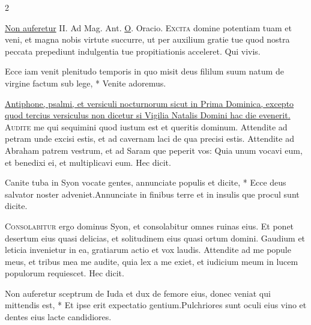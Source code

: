 \begin{multicols*}{2}
{\color{Red} }
\par {} \R \hyperlink{non-auferetur}{Non auferetur} {\color{Red} II. Ad Mag. Ant.} \hyperlink{o-antiphons}{O}. {\color{Red} Oracio.}
\lettrine[lines=2]{\zallmancaps \color{Blue} E}{xcita} domine potentiam tuam et veni, et magna nobis virtute succurre, ut per auxilium gratie tue quod nostra peccata prepediunt indulgentia tue propitiationis acceleret. Qui vivis.
\begin{invitatory}
{Ecce iam venit plenitudo temporis in quo misit deus fililum suum natum de virgine factum sub lege, * Venite adoremus.}
\end{invitatory}
\newline \ul{Antiphone, psalmi, et versiculi nocturnorum sicut in Prima Dominica, excepto quod tercius versiculus non dicetur si Vigilia Natalis Domini hac die evenerit.}
\lettrine[lines=2]{\zallmancaps \color{Red} A}{udite} me qui sequimini quod iustum est et queritis dominum. Attendite ad petram unde excisi estis, et ad cavernam laci de qua precisi estis. Attendite ad Abraham patrem vestrum, et ad Saram que peperit vos: Quia unum vocavi eum, et benedixi ei, et multiplicavi eum. Hec dicit.
\begin{responsory}
{Canite tuba in Syon vocate gentes, annunciate populis et dicite, * Ecce deus salvator noster adveniet.}{Annunciate in finibus terre et in insulis que procul sunt dicite.}
\end{responsory}%
\lettrine[lines=2]{\zallmancaps \color{Blue} C}{onsolabitur} ergo dominus Syon, et consolabitur omnes ruinas eius. Et ponet desertum eius quasi delicias, et solitudinem eius quasi ortum domini. Gaudium et leticia invenietur in ea, gratiarum actio et vox laudis. Attendite ad me popule meus, et tribus mea me audite, quia lex a me exiet, et iudicium meum in lucem populorum requiescet. Hec dicit.
\begin{responsory}
{Non auferetur sceptrum de Iuda et dux de femore eius, donec veniat qui mittendis est, * Et ipse erit expectatio gentium.}{Pulchriores sunt oculi eius vino et dentes eius lacte candidiores.}
\end{responsory}%

\end{multicols*}
